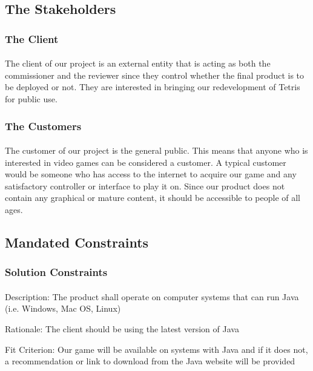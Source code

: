 \documentclass[12pt, titlepage]{article}
\begin{document}
\subsection{The Stakeholders}

\subsubsection{The Client}
\paragraph{}
The client of our project is an external entity that is acting as both the commissioner and the reviewer since they control whether the final product is to be deployed or not. They are interested in bringing our redevelopment of Tetris for public use.
\subsubsection{The Customers}
\paragraph{}
The customer of our project is the general public. This means that anyone who is interested in video games can be considered a customer. A typical customer would be someone who has access to the internet to acquire our game and any satisfactory controller or interface to play it on. Since our product does not contain any graphical or mature content, it should be accessible to people of all ages.

\subsection{Mandated Constraints}
\subsubsection{Solution Constraints}
\paragraph{}
Description: The product shall operate on computer systems that can run Java (i.e. Windows, Mac OS, Linux)

Rationale: The client should be using the latest version of Java

Fit Criterion: Our game will be available on systems with Java and if it does not, a recommendation or link to download from the Java website will be provided
\end{document}
